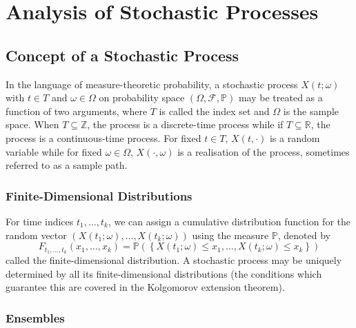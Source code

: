 \documentclass[11pt]{report} %
\begin{document}
\section{Analysis of Stochastic Processes}

\subsection{Concept of a Stochastic Process \cite{Astrom1970}}

In the language of measure-theoretic probability, a stochastic process $X\left(t; \omega\right)$ with $t \in T$ and $\omega \in \Omega$ on probability space $\left(\Omega, \mathcal{F}, \mathbb{P}\right)$ may be treated as a function of two arguments, where $T$ is called the index set and $\Omega$ is the sample space. When $T \subseteq \mathbb{Z}$, the process is a discrete-time process while if $T \subseteq \mathbb{R}$, the process is a continuous-time process. For fixed $t \in T$, $X\left(t, \cdot\right)$ is a random variable while for fixed $\omega \in \Omega$, $X\left(\cdot, \omega\right)$ is a realisation of the process, sometimes referred to as a sample path.

\subsubsection{Finite-Dimensional Distributions}

For time indices $t_{1}, \dots, t_{k}$, we can assign a cumulative distribution function for the random vector $\left(X\left(t_{1}; \omega\right), \dots, X\left(t_{k}; \omega\right)\right)$ using the measure $\mathbb{P}$, denoted by
\begin{equation}
F_{t_{1}, \dots, t_{k}}\left(x_{1}, \dots, x_{k}\right) = \mathbb{P}\left(\left\{X\left(t_{1}; \omega\right) \leq x_{1}, \dots, X\left(t_{k}; \omega\right) \leq x_{k}\right\}\right)
\end{equation}
called the finite-dimensional distribution. A stochastic process may be uniquely determined by all its finite-dimensional distributions (the conditions which guarantee this are covered in the Kolgomorov extension theorem).

\subsubsection{Ensembles}
\end{document}

